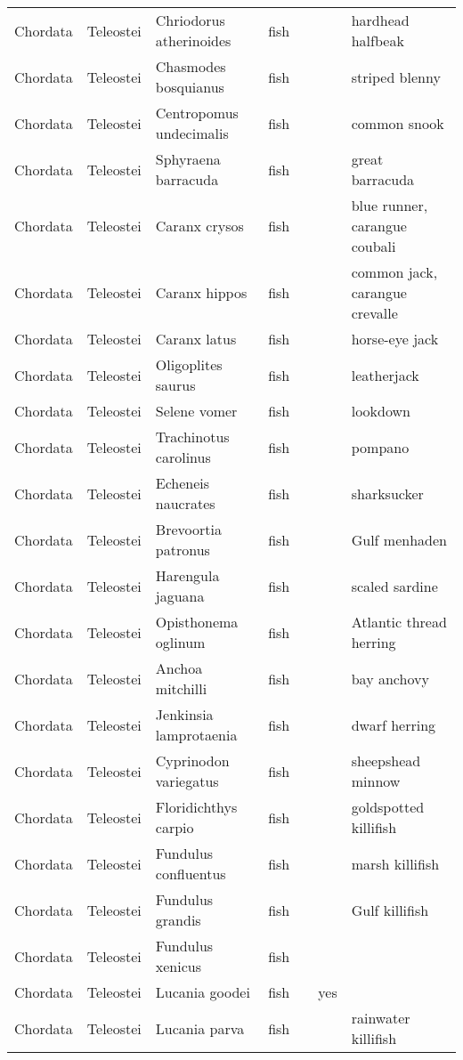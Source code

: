 \begin{longtable}{lllllll}
  Chordata & Teleostei & Chriodorus atherinoides & fish &  &  & hardhead halfbeak \\ 
  Chordata & Teleostei & Chasmodes bosquianus & fish &  &  & striped blenny \\ 
  Chordata & Teleostei & Centropomus undecimalis & fish &  &  & common snook \\ 
  Chordata & Teleostei & Sphyraena barracuda & fish &  &  & great barracuda \\ 
  Chordata & Teleostei & Caranx crysos & fish &  &  & blue runner, carangue coubali \\ 
  Chordata & Teleostei & Caranx hippos & fish &  &  & common jack, carangue crevalle \\ 
  Chordata & Teleostei & Caranx latus & fish &  &  & horse-eye jack \\ 
  Chordata & Teleostei & Oligoplites saurus & fish &  &  & leatherjack \\ 
  Chordata & Teleostei & Selene vomer & fish &  &  & lookdown \\ 
  Chordata & Teleostei & Trachinotus carolinus & fish &  &  & pompano \\ 
  Chordata & Teleostei & Echeneis naucrates & fish &  &  & sharksucker \\ 
  Chordata & Teleostei & Brevoortia patronus & fish &  &  & Gulf menhaden \\ 
  Chordata & Teleostei & Harengula jaguana & fish &  &  & scaled sardine \\ 
  Chordata & Teleostei & Opisthonema oglinum & fish &  &  & Atlantic thread herring \\ 
  Chordata & Teleostei & Anchoa mitchilli & fish &  &  & bay anchovy \\ 
  Chordata & Teleostei & Jenkinsia lamprotaenia & fish &  &  & dwarf herring \\ 
  Chordata & Teleostei & Cyprinodon variegatus & fish &  &  & sheepshead minnow \\ 
  Chordata & Teleostei & Floridichthys carpio & fish &  &  & goldspotted killifish \\ 
  Chordata & Teleostei & Fundulus confluentus & fish &  &  & marsh killifish \\ 
  Chordata & Teleostei & Fundulus grandis & fish &  &  & Gulf killifish \\ 
  Chordata & Teleostei & Fundulus xenicus & fish &  &  &  \\ 
  Chordata & Teleostei & Lucania goodei & fish &  & yes &  \\ 
  Chordata & Teleostei & Lucania parva & fish &  &  & rainwater killifish \\ 

\end{longtable}
